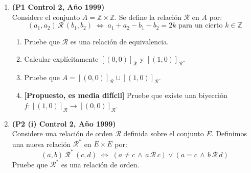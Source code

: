 \documentclass[10pt]{article}
\newcommand{\N}{\mathbb N}
\newcommand{\Z}{\mathbb Z}
\theoremstyle{plain}
\newcommand{\cur}[1]{\mathcal{#1}}
\theoremstyle{definition}
\begin{document}
\begin{enumerate}[label=\textbf{P\arabic*.-}]
\item \textbf{(P1 Control 2, Año  1999)}\\
Considere el conjunto $A=\Z\times \Z$. Se define la relación $\cur{R}$ en $A$ por:
$$(a_1,a_2)\,\cur{R}\,(b_1,b_2) \; \Longleftrightarrow \; a_1+a_2-b_1-b_2=2k \mbox{ para un cierto } k\in\Z$$
\begin{enumerate}
\item Pruebe que $\cur{R}$ es una relación de equivalencia.
\item Calcular explícitamente $[(0,0)]_{\cur{R}}$ y $[(1,0)]_{\cur{R}}$.
\item Pruebe que $A=[(0,0)]_{\cur{R}}\cup [(1,0)]_{\cur{R}}$.
\item \textbf{[Propuesto, es media difícil]} Pruebe que existe una biyección $f:[(1,0)]_{\cur{R}} \longrightarrow [(0,0)]_{\cur{R}}$.
\end{enumerate}

\item \textbf{(P2 (i) Control 2, Año 1999)}\\
Considere una relación de orden $\cur{R}$ definida sobre el conjunto $E$. Definimos una nueva relación $\cur{R}^*$ en $E\times E$ por:
$$(a,b)\,\cur{R}^*\,(c,d) \; \Longleftrightarrow \; (a\neq c \, \wedge \, a\,\cur{R}\,c) \vee (a=c \, \wedge \, b\,\cur{R}\,d)$$
Pruebe que $\cur{R}^*$ es una relación de orden.



\end{enumerate}
\end{document}
